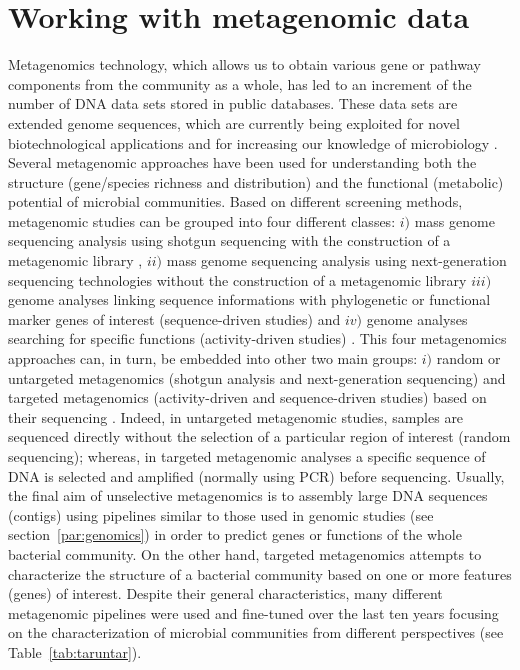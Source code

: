 \section{Working with metagenomic data}
Metagenomics technology, which allows us to obtain various gene or pathway components from the community as a whole, has led to an increment of the number of DNA data sets stored in public databases. These data sets are extended genome sequences, which are currently being exploited for novel biotechnological applications \cite{streit2004metagenomics} and for increasing our knowledge of microbiology \cite{tyson2004community}. Several metagenomic approaches have been used for understanding both the structure (gene/species richness and distribution) and the functional (metabolic) potential of microbial communities. Based on different screening methods, metagenomic studies can be grouped into four different classes: $i)$ mass genome sequencing analysis using shotgun sequencing with the construction of a metagenomic library \cite{chu2008identification}, $ii)$ mass genome sequencing analysis using next-generation sequencing technologies without the construction of a metagenomic library \cite{harismendy2009evaluation} $iii)$ genome analyses linking sequence informations with phylogenetic or functional marker genes of interest (sequence-driven studies) \cite{riesenfeld2004metagenomics} and $iv)$ genome analyses searching for specific functions (activity-driven studies) \cite{yun2005screening}. This four metagenomics approaches can, in turn, be embedded into other two main groups: $i)$ random or untargeted metagenomics (shotgun analysis and next-generation sequencing) and targeted metagenomics (activity-driven and sequence-driven studies) based on their sequencing \cite{suenaga2012targeted}. Indeed, in untargeted metagenomic studies, samples are sequenced directly without the selection of a particular region of interest (random sequencing); whereas, in targeted metagenomic analyses a specific sequence of DNA is selected and amplified (normally using PCR) before sequencing. Usually, the final aim of unselective metagenomics is to assembly large DNA sequences (contigs) using pipelines similar to those used in genomic studies (see section~\ref{par:genomics}) in order to predict genes or functions of the whole bacterial community. On the other hand, targeted metagenomics attempts to characterize the structure of a bacterial community based on one or more features (genes) of interest. Despite their general characteristics, many different metagenomic pipelines were used and fine-tuned over the last ten years focusing on the characterization of microbial communities from different perspectives (see Table~\ref{tab:taruntar}).\\
